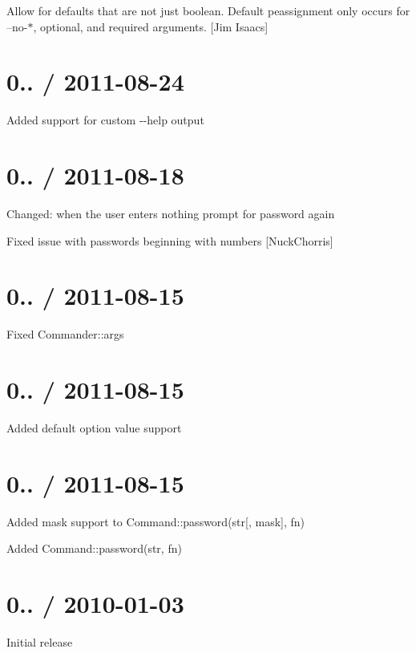 \begin{DoxyItemize}
\item Allow for defaults that are not just boolean. Default peassignment only occurs for --no-\/$\ast$, optional, and required arguments. \mbox{[}Jim Isaacs\mbox{]}
\end{DoxyItemize}

\section*{0.. / 2011-\/08-\/24 }


\begin{DoxyItemize}
\item Added support for custom {\ttfamily -\/-\/help} output
\end{DoxyItemize}

\section*{0.. / 2011-\/08-\/18 }


\begin{DoxyItemize}
\item Changed\+: when the user enters nothing prompt for password again
\item Fixed issue with passwords beginning with numbers \mbox{[}Nuck\+Chorris\mbox{]}
\end{DoxyItemize}

\section*{0.. / 2011-\/08-\/15 }


\begin{DoxyItemize}
\item Fixed {\ttfamily Commander\+::args}
\end{DoxyItemize}

\section*{0.. / 2011-\/08-\/15 }


\begin{DoxyItemize}
\item Added default option value support
\end{DoxyItemize}

\section*{0.. / 2011-\/08-\/15 }


\begin{DoxyItemize}
\item Added mask support to {\ttfamily Command\+::password(str\mbox{[}, mask\mbox{]}, fn)}
\item Added {\ttfamily Command\+::password(str, fn)}
\end{DoxyItemize}

\section*{0.. / 2010-\/01-\/03 }


\begin{DoxyItemize}
\item Initial release 
\end{DoxyItemize}